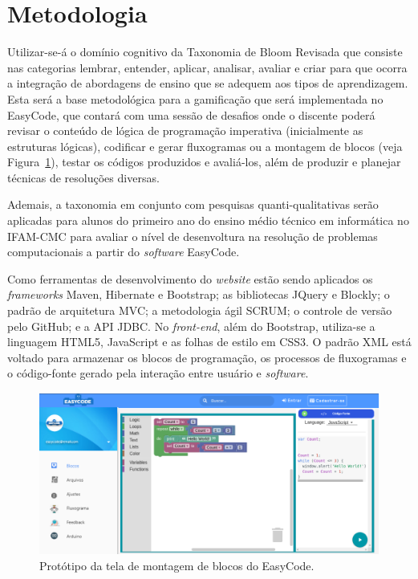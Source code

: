 \documentclass[12pt]{article}
\begin{document}
\section{Metodologia} 
Utilizar-se-á o domínio cognitivo da Taxonomia de Bloom Revisada que consiste nas categorias lembrar, entender, aplicar, analisar, avaliar e criar \cite{ANDERSON:2001} para que ocorra a integração de abordagens de ensino que se adequem aos tipos de aprendizagem. Esta será a base metodológica para a gamificação que será implementada no EasyCode, que contará com uma sessão de desafios onde o discente poderá revisar o conteúdo de lógica de programação imperativa (inicialmente as estruturas lógicas), codificar e gerar fluxogramas ou a montagem de blocos (veja Figura~\ref{fig2}), testar os códigos produzidos e avaliá-los, além de produzir e planejar técnicas de resoluções diversas.
\par Ademais, a taxonomia em conjunto com pesquisas quanti-qualitativas serão aplicadas para alunos do primeiro ano do ensino médio técnico em informática no IFAM-CMC para avaliar o nível de desenvoltura na resolução de problemas computacionais a partir do \textit{software} EasyCode.
\par Como ferramentas de desenvolvimento do \textit{website} estão sendo aplicados os \textit{frameworks} Maven, Hibernate e Bootstrap; as bibliotecas JQuery e Blockly; o padrão de arquitetura MVC; a metodologia ágil SCRUM; o controle de versão pelo GitHub; e a API JDBC. No \textit{front-end}, além do Bootstrap, utiliza-se a linguagem HTML5, JavaScript e as folhas de estilo em CSS3. O padrão XML está voltado para armazenar os blocos de programação, os processos de fluxogramas e o código-fonte gerado pela interação entre usuário e \textit{software}. 

	\begin{figure}[h]
		\centering
		\includegraphics[scale=0.4]{bloc.png}
		\caption{Protótipo da tela de montagem de blocos do EasyCode.}
		\label{fig2}
	\end{figure}
\end{document}
